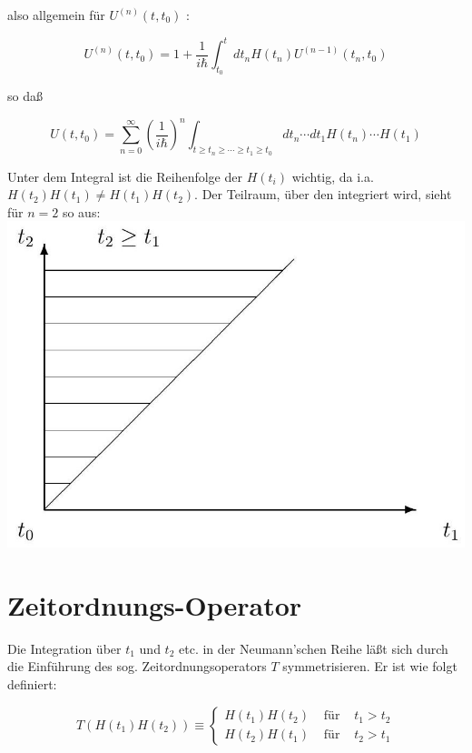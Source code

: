 \documentclass[10pt, letterpaper]{article}
\begin{document}
also allgemein für $U^{(n)}\left(t, t_{0}\right)$ :

$$
U^{(n)}\left(t, t_{0}\right)=1+\frac{1}{i \hbar} \int_{t_{0}}^{t} d t_{n} H\left(t_{n}\right) U^{(n-1)}\left(t_{n}, t_{0}\right)
$$

so daß

$$
U\left(t, t_{0}\right)=\sum_{n=0}^{\infty}\left(\frac{1}{i \hbar}\right)^{n} \int_{t \geq t_{n} \geq \cdots \geq t_{1} \geq t_{0}} d t_{n} \cdots d t_{1} H\left(t_{n}\right) \cdots H\left(t_{1}\right)
$$

Unter dem Integral ist die Reihenfolge der $H\left(t_{i}\right)$ wichtig, da i.a. $H\left(t_{2}\right) H\left(t_{1}\right) \neq H\left(t_{1}\right) H\left(t_{2}\right)$. Der Teilraum, über den integriert wird, sieht für $n=2$ so aus:\\
\includegraphics[max width=\textwidth, center]{2025_06_07_f7019c98c95e0473d81eg-03}

\section*{Zeitordnungs-Operator}
Die Integration über $t_{1}$ und $t_{2}$ etc. in der Neumann'schen Reihe läßt sich durch die Einführung des sog. Zeitordnungsoperators $T$ symmetrisieren. Er ist wie folgt definiert:

$$
T\left(H\left(t_{1}\right) H\left(t_{2}\right)\right) \equiv\left\{\begin{array}{lll}
H\left(t_{1}\right) H\left(t_{2}\right) & \text { für } & t_{1}>t_{2} \\
H\left(t_{2}\right) H\left(t_{1}\right) & \text { für } & t_{2}>t_{1}
\end{array}\right.
$$
\end{document}
